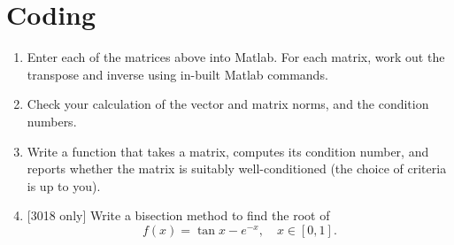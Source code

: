 \documentclass[10pt]{article}
\begin{document}
\section*{Coding}

\begin{enumerate}
\item Enter each of the matrices above into Matlab. For each matrix,
  work out the transpose and inverse using in-built Matlab commands.
\item Check your calculation of the vector and matrix norms, and the
  condition numbers.
\item Write a function that takes a matrix, computes its condition
  number, and reports whether the matrix is suitably well-conditioned
  (the choice of criteria is up to you).
\item{} [3018 only] Write a bisection method to find the root of
  \begin{equation*}
    f(x) = \tan x - e^{-x}, \quad x \in [0,1].
  \end{equation*}
\end{enumerate}
\end{document}
